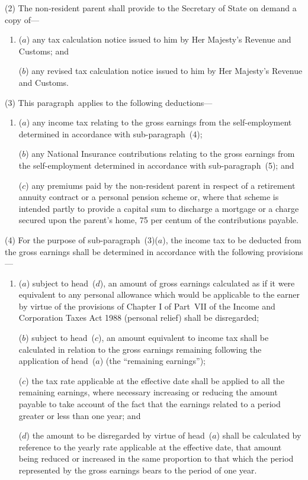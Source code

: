 \documentclass[12pt,a4paper]{article}
\begin{document}
(2) The non-resident parent shall provide to the Secretary of State on demand a copy of—
\begin{enumerate}\item[]
($a$) any tax calculation notice issued to him by Her Majesty’s Revenue and Customs; and

($b$) any revised tax calculation notice issued to him by Her Majesty’s Revenue and Customs.
\end{enumerate}

(3) This paragraph~applies to the following deductions—
\begin{enumerate}\item[]
($a$) any income tax relating to the gross earnings from the self-employment determined in accordance with sub-paragraph~(4);

($b$) any National Insurance contributions relating to the gross earnings from the self-employment determined in accordance with sub-paragraph~(5); and

($c$) any premiums paid by the non-resident parent in respect of a retirement annuity contract or a personal pension scheme or, where that scheme is intended partly to provide a capital sum to discharge a mortgage or a charge secured upon the parent’s home, 75 per centum of the contributions payable.
\end{enumerate}

(4) For the purpose of sub-paragraph~(3)($a$), the income tax to be deducted from the gross earnings shall be determined in accordance with the following provisions—
\begin{enumerate}\item[]
($a$) subject to head~($d$), an amount of gross earnings 
calculated as if it were equivalent to any personal allowance which would be  %
applicable to the earner by virtue of the provisions of Chapter I of Part~VII of the Income and Corporation Taxes Act 1988 (personal relief) shall be disregarded;

($b$) subject to head~($c$), an amount equivalent to income tax shall be calculated in relation to the gross earnings remaining following the application of head~($a$)  (the “remaining earnings”);

($c$) the tax rate applicable at the effective date shall be applied to all the remaining earnings, where necessary increasing or reducing the amount payable to take account of the fact that the earnings related to a period greater or less than one year; and

($d$) the amount to be disregarded by virtue of head~($a$)  shall be calculated by reference to the yearly rate applicable at the effective date, that amount being reduced or increased in the same proportion to that which the period represented by the gross earnings bears to the period of one year.
\end{enumerate}
\end{document}
